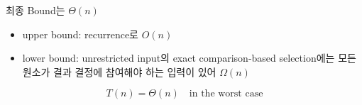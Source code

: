 \begin{frame}{최종 Bound는 $\Theta(n)$}
\begin{itemize}\item upper bound: recurrence로 $O(n)$\item lower bound: unrestricted input의 exact comparison-based selection에는 모든 원소가 결과 결정에 참여해야 하는 입력이 있어 $\Omega(n)$\end{itemize}
\[T(n)=\Theta(n)\quad\text{in the worst case}\]
\vfill{}
\vfill{}
\end{frame}
